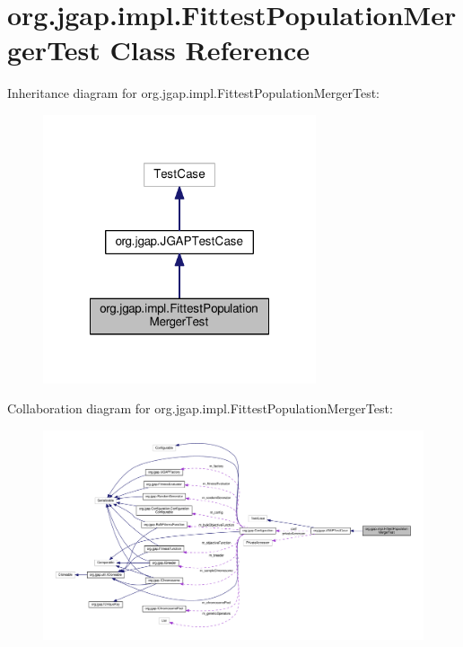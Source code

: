 \hypertarget{classorg_1_1jgap_1_1impl_1_1_fittest_population_merger_test}{\section{org.\-jgap.\-impl.\-Fittest\-Population\-Merger\-Test Class Reference}
\label{classorg_1_1jgap_1_1impl_1_1_fittest_population_merger_test}
}


Inheritance diagram for org.\-jgap.\-impl.\-Fittest\-Population\-Merger\-Test\-:
\nopagebreak
\begin{figure}[H]
\begin{center}
\leavevmode
\includegraphics[width=228pt]{classorg_1_1jgap_1_1impl_1_1_fittest_population_merger_test__inherit__graph}
\end{center}
\end{figure}


Collaboration diagram for org.\-jgap.\-impl.\-Fittest\-Population\-Merger\-Test\-:
\nopagebreak
\begin{figure}[H]
\begin{center}
\leavevmode
\includegraphics[width=350pt]{classorg_1_1jgap_1_1impl_1_1_fittest_population_merger_test__coll__graph}
\end{center}
\end{figure}
